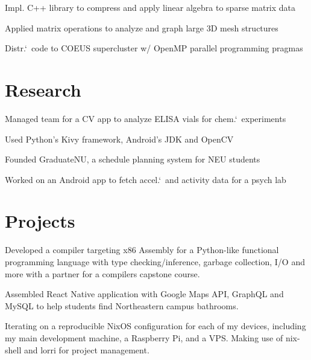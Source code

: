 \documentclass[letterpaper]{resume} %
\begin{document}
\begin{minipage}[t]{0.66\textwidth}
\begin{tightitemize}
  \item Impl. C++ library to compress and apply linear algebra to sparse matrix data
  \item Applied matrix operations to analyze and graph large 3D mesh structures
  \item Distr.`\ code to COEUS supercluster w/ OpenMP parallel programming pragmas
\end{tightitemize}

\section{Research}


\begin{tightitemize}
  \item Managed team for a CV app to analyze ELISA vials for chem.`\ experiments
  \item Used Python's Kivy framework, Android's JDK and OpenCV
  \item Founded GraduateNU, a schedule planning system for NEU students
  \item Worked on an Android app to fetch accel.`\ and activity data for a psych lab
\end{tightitemize}

\section{Projects}

Developed a compiler targeting x86 Assembly for a Python-like
functional programming language with type checking/inference,
garbage collection, I/O and more with a partner for a compilers
capstone course.
\sectionspace

Assembled React Native application with Google Maps API,
GraphQL and MySQL to help students find Northeastern campus bathrooms.
\sectionspace

Iterating on a reproducible NixOS configuration for each of my devices,
including my main development machine, a Raspberry Pi, and a VPS.\@
Making use of nix-shell and lorri for project management.
\sectionspace


\end{minipage}
\end{document}
